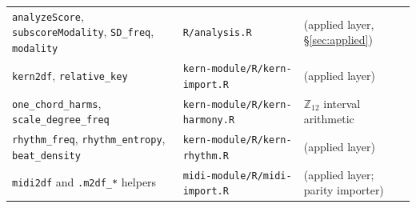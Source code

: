 \documentclass[11pt]{article}
\newcommand{\Ztwelve}{\mathbb{Z}_{12}}
\theoremstyle{definition}
\theoremstyle{remark}
\newcommand{\code}[1]{\texttt{#1}}
\newcommand{\file}[1]{\texttt{#1}}
\begin{document}
\begin{center}
\begin{tabular}{@{}llp{5.6cm}@{}}
\code{analyzeScore}, \code{subscoreModality}, \code{SD\_freq}, \code{modality} & \file{R/analysis.R} & (applied layer, \S\ref{sec:applied}) \\
\code{kern2df}, \code{relative\_key} & \file{kern-module/R/kern-import.R} & (applied layer) \\
\code{one\_chord\_harms}, \code{scale\_degree\_freq} & \file{kern-module/R/kern-harmony.R} & $\Ztwelve$ interval arithmetic \\
\code{rhythm\_freq}, \code{rhythm\_entropy}, \code{beat\_density} & \file{kern-module/R/kern-rhythm.R} & (applied layer) \\
\code{midi2df} and \code{.m2df\_*} helpers & \file{midi-module/R/midi-import.R} & (applied layer; parity importer) \\
\bottomrule
\end{tabular}
\end{center}
\end{document}
